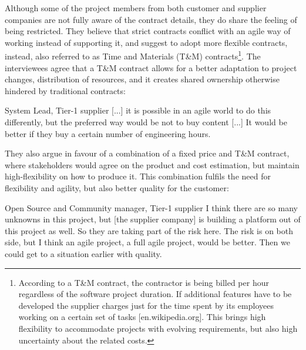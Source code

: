 Although some of the project members from both customer and supplier companies are not fully aware of the contract details, they do share the feeling of being restricted. 
%
%
They believe that strict contracts conflict with an agile way of working instead of supporting it, and suggest to adopt more flexible contracts, instead, also referred to as Time and Materials (T\&M) contracts\footnote{According to a T\&M contract, the contractor is being billed per hour regardless of the software project duration. If additional features have to be developed the supplier charges just for the time spent by its employees working on a certain set of tasks [en.wikipedia.org]. This brings high flexibility to accommodate projects with evolving requirements, but also high uncertainty about the related costs.}. 
The interviewees agree that a T\&M contract allows for a better adaptation to project changes, distribution of resources, and it creates shared ownership otherwise hindered by traditional contracts:

\begin{aquote}{System Lead, Tier-1 supplier}
[...] it is possible in an agile world to do this differently, but the preferred way would be not to buy content [...] %
It would be better if they buy a certain number of engineering hours.
\end{aquote}

They also argue in favour of a combination of a fixed price and T\&M contract, where stakeholders would agree on the product and cost estimation, but maintain high-flexibility on how to produce it. This combination fulfils the need for flexibility and agility, but also better quality for the customer:

\begin{aquote}{Open Source and Community manager, Tier-1 supplier}
I think there are so many unknowns in this project, but [the supplier company] is building a platform out of this project as well. So they are taking part of the risk here. The risk is on both side, but I think an agile project, a full agile project, would be better. Then we could get to a situation earlier with quality.
\end{aquote}

